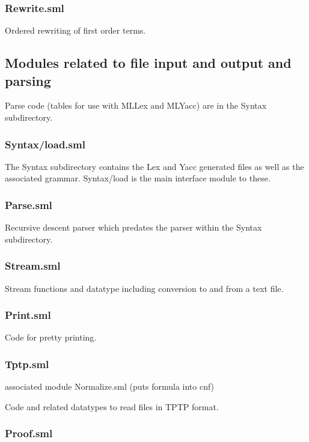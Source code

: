 \documentclass[11pt, oneside]{article}   	%
\begin{document}
\subsubsection{Rewrite.sml}

Ordered rewriting of first order terms.

\subsection{Modules related to file input and output and parsing}
Parse code (tables for use with MLLex and MLYacc) are in the Syntax subdirectory.

\subsubsection{Syntax/load.sml}

The Syntax subdirectory contains the Lex and Yacc generated files as well as the associated grammar.
Syntax/load is the main interface module to these.

\subsubsection{Parse.sml}

Recursive descent parser which predates the parser within the Syntax subdirectory.

\subsubsection{Stream.sml}

Stream functions and datatype including conversion to and from a text file.

\subsubsection{Print.sml}

Code for pretty printing.

\subsubsection{Tptp.sml} associated module Normalize.sml (puts formula into cnf)

Code and related datatypes to read files in TPTP format.

\subsubsection{Proof.sml}
\end{document}
